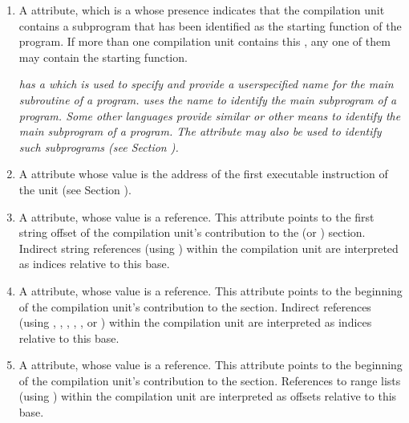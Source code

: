 \begin{enumerate}[1. ]
\item A \DWATmainsubprogram{} attribute, which is a 
whose presence indicates 
\hypertarget{chap:DWATmainsubprogramunitcontainingmainorstartingsubprogram}{}
that the compilation unit contains a
subprogram that has been identified as the starting function
of the program. If more than one compilation unit contains
this , any one of them may contain the starting function.

\textit{ has a 
which is used
to specify and provide a user\dash specified name for the main
subroutine of a program. 
 uses the name  to identify
the main subprogram of a program. Some other languages provide
similar or other means to identify the main subprogram of
a program. The \DWATmainsubprogram{} attribute may also be used to
identify such subprograms (see 
Section ).}

\item A \DWATentrypc{} attribute whose value is the address of the first
\hypertarget{chap:DWATentrypcofcompileunit}{}
\hypertarget{chap:DWATentrypcofpartialunit}{}
executable instruction of the unit (see 
Section ).

\item A \DWATstroffsetsbaseNAME{}
\hypertarget{chap:DWATstroffsetbaseforindirectstringtable}{} 
attribute, whose value is a reference. 
This attribute points to the first string
offset of the compilation unit's contribution to the
\dotdebugstroffsets{} (or \dotdebugstroffsetsdwo{}) section. 
Indirect string references
(using \DWFORMstrx) within the compilation unit are
interpreted as indices relative to this base.

\item A \DWATaddrbaseNAME{}
\hypertarget{chap:DWATaddrbaseforaddresstable}{}
attribute, whose value is a reference.
This attribute points to the beginning of the compilation
unit's contribution to the \dotdebugaddr{} section.
Indirect references (using \DWFORMaddrx, \DWOPaddrx, 
\DWOPconstx, \DWLLEbaseaddressselectionentry{}, 
\DWLLEstartendentry, or \DWLLEstartlengthentry) within the compilation unit are
interpreted as indices relative to this base.

\item A \DWATrangesbaseNAME{}
\hypertarget{chap:DWATrangesbaseforrangelists}{}
attribute, whose value is a reference.
This attribute points to the beginning of the compilation
unit's contribution to the \dotdebugranges{} section.
References to range lists (using \DWFORMsecoffset)
within the compilation unit are
interpreted as offsets relative to this base.

\end{enumerate}

